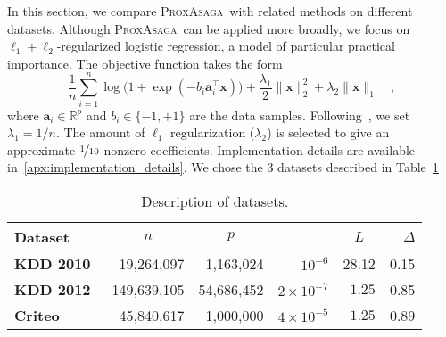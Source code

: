 \documentclass{article}
\newcommand{\PASAGA}{\textsc{ProxAsaga}}
\newcommand{\AsySPCD}{\textsc{AsySpcd}}
\def\xx{{\boldsymbol x}}
\newcommand{\tablefont}[1] {{\fontsize{8}{10}\sffamily{#1}}}
\begin{document}
In this section, we compare \PASAGA\ with related methods on different datasets.
Although \PASAGA\ can be applied more broadly, we focus on $\ell_1\!+\!\ell_2$-regularized logistic regression, a model of particular practical importance.
The objective function takes the form
\begin{equation}\label{eq:logistic_loss}
  \frac{1}{n} \sum_{i=1}^n \log\big(1 + \exp(- b_i \boldsymbol a_i^\intercal \xx)\big) + \textstyle\frac{\lambda_1}{2} \|\xx\|_2^2 + \lambda_2 \|\xx\|_1\quad,
\end{equation}
where $\boldsymbol a_i \in \mathbb{R}^p$ and $b_i \in \{-1,+1\}$ are the data samples. Following~\citet{defazio2014saga}, we set $\lambda_1 = 1/n$. The amount of $\ell_1$ regularization ($\lambda_2$) is selected to give an approximate $\nicefrac{1}{10}$ nonzero coefficients. Implementation details are available in~\ref{apx:implementation_details}. We chose the 3 datasets described in Table~\ref{tab:datasets}
\begin{table}
\caption{Description of datasets.} \label{tab:datasets}
\centering
\begin{tabular}{lrrrrr}
\toprule
{\bfseries\sffamily Dataset} & \multicolumn{1}{c}{$n$} & \multicolumn{1}{c}{$p$} & {\tablefont{density}} & \multicolumn{1}{c}{$L$} & $\Delta$\\
\midrule
{\bfseries\sffamily KDD 2010}~\citep{yu2010feature} & \hfill 19,264,097 & \hfill 1,163,024 & \hfill $10^{-6}$ & \hfill 28.12 & 0.15\\
{\bfseries\sffamily KDD 2012}~\citep{juan2016field} & \hfill 149,639,105 & \hfill 54,686,452 & \hfill $2 \times 10^{-7}$ & \hfill $1.25$ & 0.85\\
{\bfseries\sffamily Criteo}~\citep{juan2016field} & \hfill 45,840,617 & \hfill 1,000,000 & \hfill $4 \times 10^{-5}$ & \hfill $1.25$ & 0.89\\
\bottomrule
\end{tabular}
\end{table}


\begin{figure*}
\caption{{\bfseries Convergence for asynchronous stochastic methods for $\ell_1 + \ell_2$-regularized logistic regression}. {Top}: Suboptimality as a function of time for different asynchronous methods using 1 and 10 cores.
%
{Bottom}: Running time speedup as function of the number of cores. \PASAGA\ achieves significant speedups over its sequential version while being orders of magnitude faster than competing methods.
\AsySPCD\ achieves the highest speedups but it also the slowest overall method.
}\label{fig:suboptimality}
\end{figure*}
\end{document}
